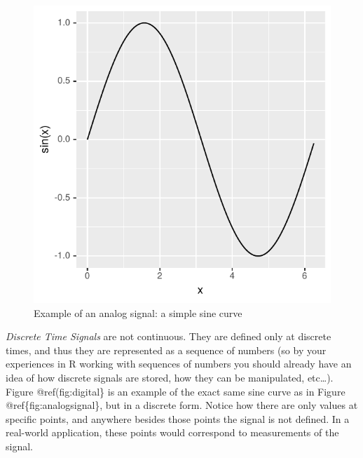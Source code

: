 \documentclass[
]{krantz}
\begin{document}
\begin{figure}
\centering
\includegraphics{bookdown_files/figure-latex/analogsignal-1.pdf}
\caption{\label{fig:analogsignal}Example of an analog signal: a simple sine curve}
\end{figure}

\emph{Discrete Time Signals} are not continuous. They are defined only at discrete times, and thus they are represented as a sequence of numbers (so by your experiences in R working with sequences of numbers you should already have an idea of how discrete signals are stored, how they can be manipulated, etc\ldots). Figure @ref(fig:digital\} is an example of the exact same sine curve as in Figure @ref\{fig:analogsignal\}, but in a discrete form. Notice how there are only values at specific points, and anywhere besides those points the signal is not defined. In a real-world application, these points would correspond to measurements of the signal.
\end{document}
